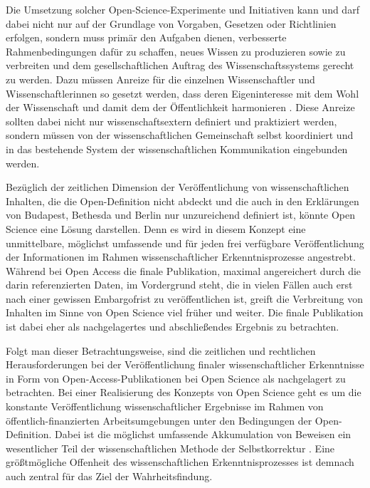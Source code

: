 Die Umsetzung solcher Open-Science-Experimente und Initiativen kann und darf dabei nicht nur auf der Grundlage von Vorgaben, Gesetzen oder Richtlinien erfolgen, sondern muss primär den Aufgaben dienen, verbesserte Rahmenbedingungen dafür zu schaffen, neues Wissen zu produzieren sowie zu verbreiten und dem gesellschaftlichen Auftrag des Wissenschaftssystems gerecht zu werden. Dazu müssen Anreize für die einzelnen Wissenschaftler und Wissenschaftlerinnen so gesetzt werden, dass deren Eigeninteresse mit dem Wohl der Wissenschaft und damit dem der Öffentlichkeit harmonieren \cite{Brembs_2015}. Diese Anreize sollten dabei nicht nur wissenschaftsextern definiert und praktiziert werden, sondern müssen von der wissenschaftlichen Gemeinschaft selbst koordiniert und in das bestehende System der wissenschaftlichen Kommunikation eingebunden werden.

Bezüglich der zeitlichen Dimension der Veröffentlichung von wissenschaftlichen Inhalten, die die Open-Definition nicht abdeckt und die auch in den Erklärungen von Budapest, Bethesda und Berlin nur unzureichend definiert ist, könnte Open Science eine Lösung darstellen. Denn es wird in diesem Konzept eine unmittelbare, möglichst umfassende und für jeden frei verfügbare Veröffentlichung der Informationen im Rahmen wissenschaftlicher Erkenntnisprozesse angestrebt. Während bei Open Access die finale Publikation, maximal angereichert durch die darin referenzierten Daten, im Vordergrund steht, die in vielen Fällen auch erst nach einer gewissen Embargofrist zu veröffentlichen ist, greift die Verbreitung von Inhalten im Sinne von Open Science viel früher und weiter. Die finale Publikation ist dabei eher als nachgelagertes und abschließendes Ergebnis zu betrachten.

Folgt man dieser Betrachtungsweise, sind die zeitlichen und rechtlichen Herausforderungen bei der Veröffentlichung finaler wissenschaftlicher Erkenntnisse in Form von Open-Access-Publikationen bei Open Science als nachgelagert zu betrachten. Bei einer Realisierung des Konzepts von Open Science geht es um die konstante Veröffentlichung wissenschaftlicher Ergebnisse im Rahmen von öffentlich-finanzierten Arbeitsumgebungen unter den Bedingungen der Open-Definition. Dabei ist die möglichst umfassende Akkumulation von Beweisen ein wesentlicher Teil der wissenschaftlichen Methode der Selbstkorrektur \cite{Nosek_2015}. Eine größtmögliche Offenheit des wissenschaftlichen Erkenntnisprozesses ist demnach auch zentral für das Ziel der Wahrheitsfindung.

